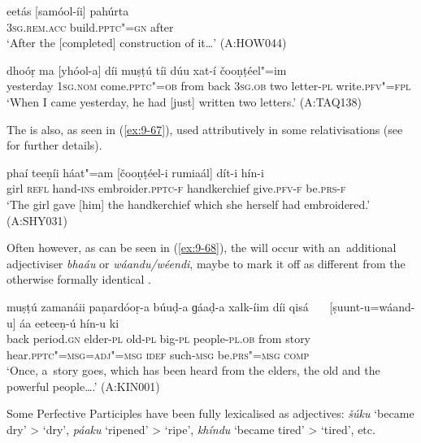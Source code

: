 \begin{exe}
\ex
\label{ex:9-65}
\gll eetás [samóol-íi] pahúrta \\
\textsc{3sg.rem.acc} build.\textsc{pptc"=gn} after \\
\glt `After the [completed] construction of it{\ldots}' (A:HOW044)

\ex
\label{ex:9-66}
\gll dhoóṛ ma [yhóol-a] díi muṣṭú tíi dúu xat-í čooṇṭéel"=im\\
yesterday 1\textsc{sg.nom} come.\textsc{pptc"=ob} from back \textsc{3sg.ob} two letter-\textsc{pl} write.\textsc{pfv"=fpl}\\
\glt `When I came yesterday, he had [just] written two letters.' (A:TAQ138)
\end{exe}

The  is also, as seen in (\ref{ex:9-67}), used attributively in some relativisations (see  for further details).

\begin{exe}
\ex
\label{ex:9-67}
\gll phaí teeṇíi háat"=am [čooṇṭéel-i rumiaál] dít-i hín-i \\
girl \textsc{refl} hand-\textsc{ins} embroider.\textsc{pptc-f} handkerchief give.\textsc{pfv-f} be.\textsc{prs-f} \\
\glt `The girl gave [him] the handkerchief which she herself had embroidered.' (A:SHY031)
\end{exe}

Often however, as can be seen in (\ref{ex:9-68}), the  will occur with an~additional adjectiviser \textit{bhaáu} or \textit{wáandu/wéendi}, maybe to mark it off as different from the otherwise formally identical .

\begin{exe}
\ex
\label{ex:9-68}
\gll muṣṭú zamanáii paṇardóoṛ-a búuḍ-a ɡáaḍ-a xalk-íim díi {qisá~~~} [ṣuunt-u=wáand-u] áa eeteeṇ-ú hín-u ki\\
back period.\textsc{gn} elder-\textsc{pl} old-\textsc{pl} big-\textsc{pl}  people-\textsc{pl.ob} from story hear.\textsc{pptc"=msg=adj"=msg} \textsc{idef} such-\textsc{msg} be.\textsc{prs"=msg} \textsc{comp} \\
\glt `Once, a~story goes, which has been heard from the elders, the old and the powerful people{\ldots}.'
(A:KIN001)
\end{exe}

Some Perfective Participles have been fully lexicalised as adjectives: \textit{šúku} `became dry' {\textgreater} `dry', \textit{páaku} `ripened' {\textgreater} `ripe', \textit{khíndu} `became tired' {\textgreater} `tired', etc.


